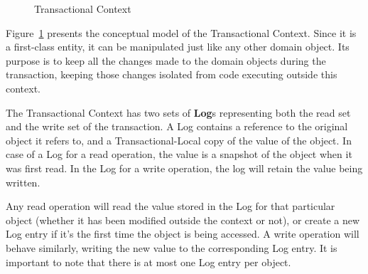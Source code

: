 \documentclass{llncs}
\begin{document}
\begin{figure}
  \centering

  \caption{Transactional Context}
  \label{fig:transactionalContext}

\end{figure}

Figure~\ref{fig:transactionalContext} presents the conceptual model of
the Transactional Context. Since it is a first-class entity, it can be
manipulated just like any other domain object. Its purpose is to keep
all the changes made to the domain objects during the transaction,
keeping those changes isolated from code executing outside this
context.

The Transactional Context has two sets of {\bf Log}s representing both
the read set and the write set of the transaction. A Log contains a
reference to the original object it refers to, and a
Transactional-Local copy of the value of the object. In case of a Log
for a read operation, the value is a snapshot of the object when it
was first read. In the Log for a write operation, the log will retain
the value being written.

Any read operation will read the value stored in the Log for that
particular object (whether it has been modified outside the context or
not), or create a new Log entry if it's the first time the object is
being accessed. A write operation will behave similarly, writing the
new value to the corresponding Log entry. It is important to note that
there is at most one Log entry per object.
\end{document}
